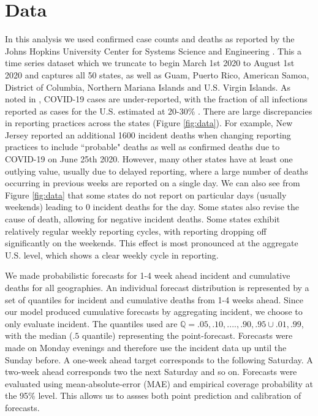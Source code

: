 \documentclass{umassthesis}          %
\begin{document}
\section{Data}
	In this analysis we used confirmed case counts and deaths as reported by the Johns Hopkins University Center for Systems Science and Engineering \cite{dong2020interactive}. This a time series dataset which we truncate to begin March 1st 2020 to August 1st 2020 and captures all 50 states, as well as Guam, Puerto Rico, American Samoa, District of Columbia, Northern Mariana Islands and U.S. Virgin Islands. As noted in \cite{krantz2020level}, COVID-19 cases are under-reported, with the fraction of all infections reported as cases for the U.S. estimated at 20-30\% \cite{russel2020using}. 
		There are large discrepancies in reporting practices across the states (Figure \ref{fig:data}). For example, New Jersey reported an additional 1600 incident deaths when changing reporting practices to include ``probable" deaths as well as confirmed deaths due to COVID-19 on June 25th 2020. However, many other states have at least one outlying value, usually due to delayed reporting, where a large number of deaths occurring in previous weeks are reported on a single day. We can also see from Figure \ref{fig:data} that some states do not report on particular days (usually weekends) leading to 0 incident deaths for the day. Some states also revise the cause of death, allowing for negative incident deaths.  Some states exhibit relatively regular weekly reporting cycles, with reporting dropping off significantly on the weekends. This effect is most pronounced at the aggregate U.S. level, which shows a clear weekly cycle in reporting. 
	
	
We made probabilistic forecasts  for 1-4 week ahead incident and cumulative deaths for all geographies. An individual forecast distribution is represented by a set of quantiles for incident and cumulative deaths from 1-4 weeks ahead. Since our model produced cumulative forecasts by aggregating incident, we choose to only evaluate incident. The quantiles used are $\mathbb{Q} = {.05,.10,....,.90,.95} \cup {.01,.99}$, with the median ($.5$ quantile) representing the point-forecast. Forecasts were made on Monday evenings and therefore use the incident data up until the Sunday before. A one-week ahead target corresponds to the following Saturday. A two-week ahead corresponds two the next Saturday and so on. Forecasts were evaluated using mean-absolute-error (MAE) and empirical coverage probability at the 95\% level. This allows us to assses both point prediction and calibration of forecasts.
\end{document}
